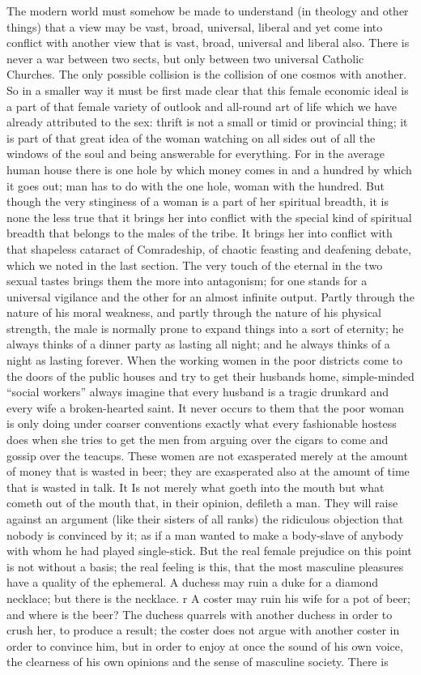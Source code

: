\documentclass{book}
\begin{document}
The modern world must somehow be made to understand (in theology and other things) that a view may be vast, broad, universal, liberal and yet come into conflict with another view that is vast, broad, universal and liberal also. There is never a war between two sects, but only between two universal Catholic Churches. The only possible collision is the collision of one cosmos with another. So in a smaller way it must be first made clear that this female economic ideal is a part of that female variety of outlook and all-round art of life which we have already attributed to the sex: thrift is not a small or timid or provincial thing; it is part of that great idea of the woman watching on all sides out of all the windows of the soul and being answerable for everything. For in the average human house there is one hole by which money comes in and a hundred by which it goes out; man has to do with the one hole, woman with the hundred. But though the very stinginess of a woman is a part of her spiritual breadth, it is none the less true that it brings her into conflict with the special kind of spiritual breadth that belongs to the males of the tribe. It brings her into conflict with that shapeless cataract of Comradeship, of chaotic feasting and deafening debate, which we noted in the last section. The very touch of the eternal in the two sexual tastes brings them the more into antagonism; for one stands for a universal vigilance and the other for an almost infinite output. Partly through the nature of his moral weakness, and partly through the nature of his physical strength, the male is normally prone to expand things into a sort of eternity; he always thinks of a dinner party as lasting all night; and he always thinks of a night as lasting forever. When the working women in the poor districts come to the doors of the public houses and try to get their husbands home, simple-minded “social workers” always imagine that every husband is a tragic drunkard and every wife a broken-hearted saint. It never occurs to them that the poor woman is only doing under coarser conventions exactly what every fashionable hostess does when she tries to get the men from arguing over the cigars to come and gossip over the teacups. These women are not exasperated merely at the amount of money that is wasted in beer; they are exasperated also at the amount of time that is wasted in talk. It Is not merely what goeth into the mouth but what cometh out of the mouth that, in their opinion, defileth a man. They will raise against an argument (like their sisters of all ranks) the ridiculous objection that nobody is convinced by it; as if a man wanted to make a body-slave of anybody with whom he had played single-stick. But the real female prejudice on this point is not without a basis; the real feeling is this, that the most masculine pleasures have a quality of the ephemeral. A duchess may ruin a duke for a diamond necklace; but there is the necklace. r A coster may ruin his wife for a pot of beer; and where is the beer? The duchess quarrels with another duchess in order to crush her, to produce a result; the coster does not argue with another coster in order to convince him, but in order to enjoy at once the sound of his own voice, the clearness of his own opinions and the sense of masculine society. There is 
\end{document}
